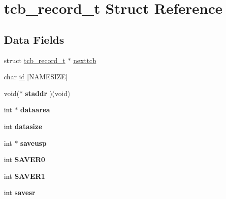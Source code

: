 \hypertarget{structtcb__record__t}{}\section{tcb\+\_\+record\+\_\+t Struct Reference}
\label{structtcb__record__t}
\subsection*{Data Fields}
\begin{DoxyCompactItemize}
\item 
struct \mbox{\hyperlink{structtcb__record__t}{tcb\+\_\+record\+\_\+t}} $\ast$ \mbox{\hyperlink{structtcb__record__t_abe5f58939c000c4f6b06c911bead561c}{nexttcb}}
\item 
char \mbox{\hyperlink{structtcb__record__t_aa25efaaaecf8c7c4d679dbc94aec3031}{id}} \mbox{[}N\+A\+M\+E\+S\+I\+ZE\mbox{]}
\item 
\mbox{\label{structtcb__record__t_a0bd4589e0b8513e1de0a399b78d68f87}} 
void($\ast$ {\bfseries staddr} )(void)
\item 
\mbox{\label{structtcb__record__t_ac4967b1b1e7ad970a0f020b0d1ee6356}} 
int $\ast$ {\bfseries dataarea}
\item 
\mbox{\label{structtcb__record__t_a5c7949e884a8b9b3d1ab9f070267bf33}} 
int {\bfseries datasize}
\item 
\mbox{\label{structtcb__record__t_a2f3abb0a3bc5b95a1f3a186b39df8563}} 
int $\ast$ {\bfseries saveusp}
\item 
\mbox{\label{structtcb__record__t_a5cc0b58f21674c6f2360277fda7110db}} 
int {\bfseries S\+A\+V\+E\+R0}
\item 
\mbox{\label{structtcb__record__t_a82b96d60fcbfbacab45247b8be146e63}} 
int {\bfseries S\+A\+V\+E\+R1}
\item 
\mbox{\label{structtcb__record__t_aaec8acf0045579c29a846ad6691ac5ca}} 
int {\bfseries savesr}
\item 
\mbox{\label{structtcb__record__t_a1cd699134048594684fdc0c1a5ed1ed3}} 

\end{DoxyCompactItemize}
